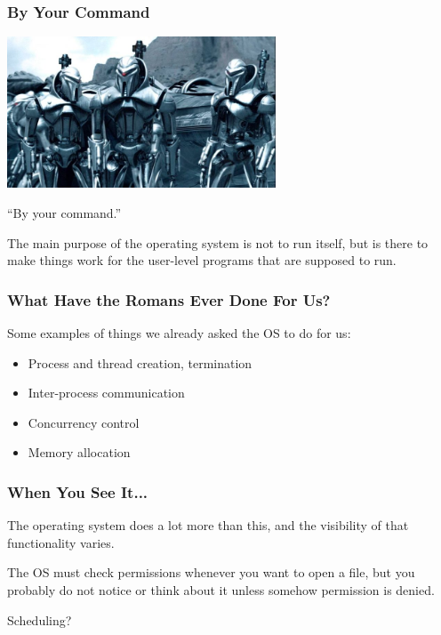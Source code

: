 \begin{frame}
\frametitle{By Your Command}

\begin{center}
	\includegraphics[width=0.6\textwidth]{images/centurions.jpg}
\end{center}
\hfill``By your command.''

The main purpose of the operating system is not to run itself, but is there to make things work for the user-level programs that are supposed to run. 

\end{frame}

\begin{frame}
\frametitle{What Have the Romans Ever Done For Us?}

Some examples of things we already asked the OS to do for us:

\begin{itemize}
	\item Process and thread creation, termination
	\item Inter-process communication
	\item Concurrency control
	\item Memory allocation
\end{itemize}

\end{frame}

\begin{frame}
\frametitle{When You See It...}

The operating system does a lot more than this, and the visibility of that functionality varies.

The OS must check permissions whenever you want to open a file, but you probably do not notice or think about it unless somehow permission is denied.

Scheduling?

\end{frame}

